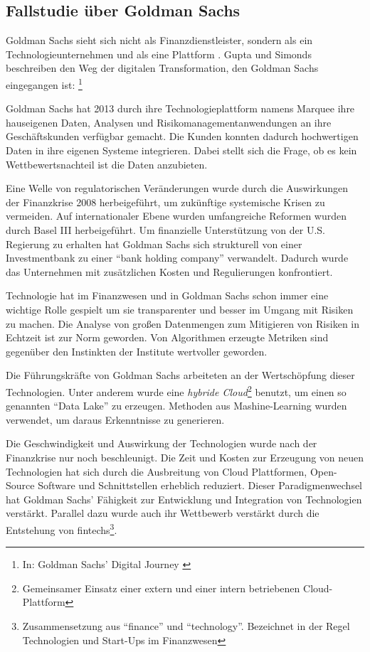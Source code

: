 \subsection{Fallstudie über Goldman Sachs}
Goldman Sachs sieht sich nicht als Finanzdienstleister, sondern als ein Technologieunternehmen und als eine Plattform \cite{Gupta:2017}. Gupta und Simonds beschreiben den Weg der digitalen Transformation, den Goldman Sachs eingegangen ist: \footnote{In: Goldman Sachs' Digital Journey \cite{Gupta:2017}}

Goldman Sachs hat 2013 durch ihre Technologieplattform namens Marquee ihre hauseigenen Daten, Analysen und Risikomanagementanwendungen an ihre Geschäftskunden verfügbar gemacht. Die Kunden konnten dadurch hochwertigen Daten in ihre eigenen Systeme integrieren. Dabei stellt sich die Frage, ob es kein Wettbewertsnachteil ist die Daten anzubieten.

Eine Welle von regulatorischen Veränderungen wurde durch die Auswirkungen der Finanzkrise 2008 herbeigeführt, um zukünftige systemische Krisen zu vermeiden. Auf internationaler Ebene wurden umfangreiche Reformen wurden durch Basel III herbeigeführt. Um finanzielle Unterstützung von der U.S. Regierung zu erhalten hat Goldman Sachs sich strukturell von einer Investmentbank zu einer \enquote{bank holding company} verwandelt. Dadurch wurde das Unternehmen mit zusätzlichen Kosten und Regulierungen konfrontiert.

Technologie hat im Finanzwesen und in Goldman Sachs schon immer eine wichtige Rolle gespielt um sie transparenter und besser im Umgang mit Risiken zu machen. Die Analyse von großen Datenmengen zum Mitigieren von Risiken in Echtzeit ist zur Norm geworden. Von Algorithmen erzeugte Metriken sind gegenüber den Instinkten der Institute wertvoller geworden.

Die Führungskräfte von Goldman Sachs arbeiteten an der Wertschöpfung dieser Technologien. Unter anderem wurde eine \emph{hybride Cloud}\footnote{Gemeinsamer Einsatz einer extern und einer intern betriebenen Cloud-Plattform} benutzt, um einen so genannten \enquote{Data Lake} zu erzeugen. Methoden aus Mashine-Learning wurden verwendet, um daraus Erkenntnisse zu generieren. 

Die Geschwindigkeit und Auswirkung der Technologien wurde nach der Finanzkrise nur noch beschleunigt. Die Zeit und Kosten zur Erzeugung von neuen Technologien hat sich durch die Ausbreitung von Cloud Plattformen, Open-Source Software und Schnittstellen erheblich reduziert. Dieser Paradigmenwechsel hat Goldman Sachs' Fähigkeit zur Entwicklung und Integration von Technologien verstärkt. Parallel dazu wurde auch ihr Wettbewerb verstärkt durch die Entstehung von fintechs\footnote{Zusammensetzung aus \enquote{finance} und \enquote{technology}. Bezeichnet in der Regel Technologien und Start-Ups im Finanzwesen}.

